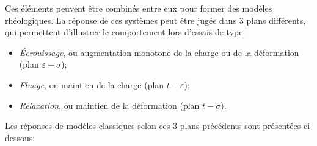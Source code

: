 \medskip
Ces éléments peuvent être combinés entre eux pour former des modèles rhéologiques. 
La réponse de ces systèmes peut être jugée dans 3 plans différents, qui permettent d'illustrer le 
comportement lors d'essais de type:
\begin{itemize}
   \item \emph{Écrouissage}, ou augmentation monotone de la charge ou de la déformation 
	(plan $\varepsilon-\sigma$);
   \item \emph{Fluage}, ou maintien de la charge (plan $t-\varepsilon$);
   \item \emph{Relaxation}, ou maintien de la déformation (plan $t-\sigma$).
\end{itemize}

\medskip
Les réponses de modèles classiques selon ces 3 plans précédents sont présentées ci-dessous:
